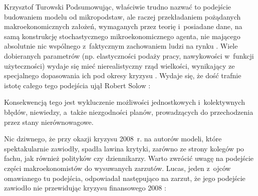 \begin{artplenv}{Krzysztof Turowski}
Podsumowując, właściwie trudno nazwać to podejście budowaniem modelu od mikropodstaw, ale raczej przekładaniem
pożądanych makroekonomicznych założeń, wymaganych przez teorię i~posiadane dane, na samą konstrukcję stochastycznego
mikroekonomicznego agenta, nie mającego absolutnie nic wspólnego z~faktycznym zachowaniem ludzi na rynku
\parencite{machaj_money_2017}.
Wiele dobieranych parametrów (np. elastyczności podaży pracy,
nawykowości w~funkcji użyteczności) wydaje się mieć nierealistyczny rząd wielkości, wynikający ze specjalnego dopasowania ich pod
okresy kryzysu
\parencite{korinek_thoughts_2017}.
Wydaje się, że dość trafnie istotę całego tego podejścia ujął
Robert Solow
\parencite[s.~241]{solow_state_2008}:


Konsekwencją tego jest wykluczenie możliwości jednostkowych i~kolektywnych błędów, niewiedzy, a~także niezgodności
planów, prowadzących do przechodzenia przez stany nierównowagowe.

Nic dziwnego, że przy okazji kryzysu 2008~r. na autorów modeli, które spektakularnie zawiodły, spadła lawina krytyki,
zarówno ze strony kolegów po fachu, jak również polityków czy dziennikarzy. Warto zwrócić uwagę na podejście części
makroekonomistów do wysuwanych zarzutów. Lucas, jeden z~ojców omawianego tu podejścia, odpowiadał następująco na
zarzut, że jego podejście zawiodło nie przewidując kryzysu finansowego 2008
\parencite{lucas_defence_2009}:


\end{artplenv}

